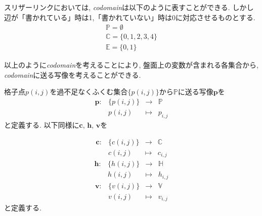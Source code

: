 \begin{example}\label{example:SlitherLinkCodomain}
  スリザーリンクにおいては, \textit{codomain}は以下のように表すことができる. しかし辺が「書かれている」時は1,「書かれていない」時は0に対応させるものとする.
  \begin{gather*}
    \mathbb{P}  =  \emptyset     \\
    \mathbb{C}  =  \{0,1,2,3,4\} \\
    \mathbb{E}  =  \{0,1\}
  \end{gather*}
\end{example}
以上のように\textit{codomain}を考えることにより, 盤面上の変数が含まれる各集合から, \textit{codomain}に送る写像を考えることができる.
\begin{definition}[写像$\bm{p}$, $\bm{c}$, $\bm{h}$, $\bm{v}$]\label{definition:Mapping}
  格子点$p(i,j)$を過不足なくふくむ集合$\{p(i,j)\}$から$\mathbb{P}$に送る写像$\bm{p}$を
  \begin{equation*}
    \begin{array}{rccc}
      \bm{p}\colon & \{p(i,j)\} & \longrightarrow & \mathbb{P} \\
                   & p(i,j)     & \longmapsto     & p_{i,j}
    \end{array}
  \end{equation*}
  と定義する.
  以下同様に$\bm{c}$, $\bm{h}$, $\bm{v}$を

  \begin{equation*}
    \begin{array}{rccc}
      \bm{c}\colon & \{c(i,j)\} & \longrightarrow & \mathbb{C} \\
                   & c(i,j)     & \longmapsto     & c_{i,j}
    \end{array}
  \end{equation*}
  \begin{equation*}
    \begin{array}{rccc}
      \bm{h}\colon & \{h(i,j)\} & \longrightarrow & \mathbb{H} \\
                   & h(i,j)     & \longmapsto     & h_{i,j}
    \end{array}
  \end{equation*}
  \begin{equation*}
    \begin{array}{rccc}
      \bm{v}\colon & \{v(i,j)\} & \longrightarrow & \mathbb{V} \\
                   & v(i,j)     & \longmapsto     & v_{i,j}
    \end{array}
  \end{equation*}
  と定義する.


\end{definition}
